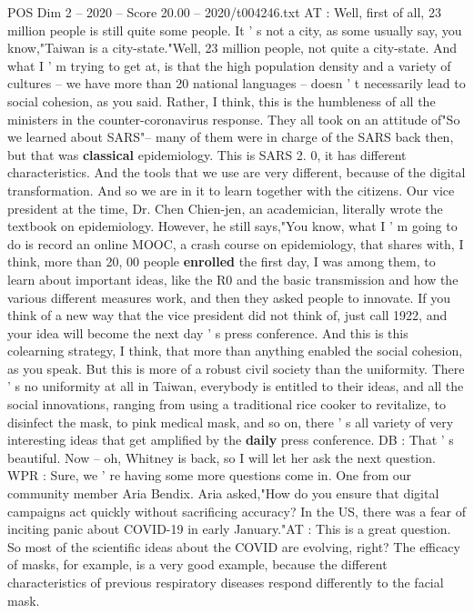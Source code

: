 \begin{textsample}{POS Dim 2 – 2020 – Score 20.00 – 2020/t004246.txt}
AT : Well, first of all, 23 million people is still quite some people.
It ' s not a city, as some usually say, you know,"Taiwan is a city-state."Well, 23 million people, not quite a city-state.
And what I ' m trying to get at, is that the high population density and a variety of cultures -- we have more than 20 national languages -- doesn ' t necessarily lead to social cohesion, as you said.
Rather, I think, this is the humbleness of all the ministers in the counter-coronavirus response.
They all took on an attitude of"So we learned about SARS"-- many of them were in charge of the SARS back then, but that was \textbf{classical} epidemiology.
This is SARS 2. 0, it has different characteristics.
And the tools that we use are very different, because of the digital transformation.
And so we are in it to learn together with the citizens.
Our vice president at the time, Dr.
Chen Chien-jen, an academician, literally wrote the textbook on epidemiology.
However, he still says,"You know, what I ' m going to do is record an online MOOC, a crash course on epidemiology, that shares with, I think, more than 20, 00 people \textbf{enrolled} the first day, I was among them, to learn about important ideas, like the R0 and the basic transmission and how the various different measures work, and then they asked people to innovate.
If you think of a new way that the vice president did not think of, just call 1922, and your idea will become the next day ' s press conference.
And this is this colearning strategy, I think, that more than anything enabled the social cohesion, as you speak.
But this is more of a robust civil society than the uniformity.
There ' s no uniformity at all in Taiwan, everybody is entitled to their ideas, and all the social innovations, ranging from using a traditional rice cooker to revitalize, to disinfect the mask, to pink medical mask, and so on, there ' s all variety of very interesting ideas that get amplified by the \textbf{daily} press conference.
DB : That ' s beautiful.
Now -- oh, Whitney is back, so I will let her ask the next question.
WPR : Sure, we ' re having some more questions come in.
One from our community member Aria Bendix.
Aria asked,"How do you ensure that digital campaigns act quickly without sacrificing accuracy?
In the US, there was a fear of inciting panic about COVID-19 in early January."AT : This is a great question.
So most of the scientific ideas about the COVID are evolving, right?
The efficacy of masks, for example, is a very good example, because the different characteristics of previous respiratory diseases respond differently to the facial mask.

\end{textsample}
